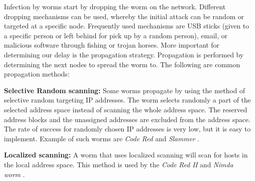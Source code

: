 Infection by worms start by dropping the worm on the network. Different dropping mechanisms can be used, whereby the initial attack can be random or targeted at a specific node. Frequently used mechanisms are USB sticks (given to a specific person or left behind for pick up by a random person), email, or malicious software through fishing or trojan horses. More important for determining our delay is the propagation strategy. Propagation is performed by determining the next nodes to spread the worm to. The following are common propagation methods: 
\begin{description}

\item \textbf{Selective Random scanning:} Some worms propagate by using the method of selective random targeting IP addresses. The worm selects randomly a part of the selected address space instead of scanning the whole address space. The reserved address blocks and the unassigned addresses are excluded from the address space. The rate of success for randomly chosen IP addresses is very low, but it is easy to implement. Example of such worms are \textit{Code Red} \citep{OwnInternetSI} and \textit{Slammer} \citep{moore2003inside}.

\item \textbf{Localized scanning:} A worm that uses localized scanning will scan for hosts in the local address space. This method is used by the \textit{Code Red II} \citep{OwnInternetSI} and \textit{Nimda worm} \citep{OwnInternetSI}.



\end{description}
